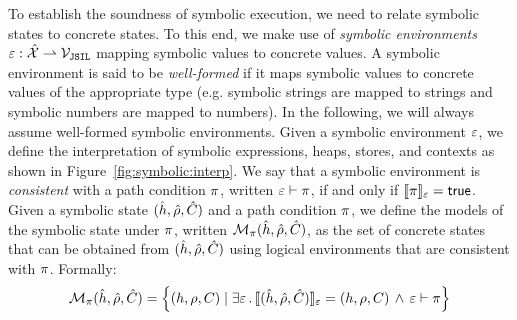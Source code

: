  To establish the soundness of symbolic execution, we need to relate 
symbolic states to concrete states. To this end, we make use of \emph{symbolic environments} 
$\varepsilon : \hat{\mathcal{X}} \rightharpoonup \mathcal{V}_{\mathtt{JSIL}}$ mapping symbolic values to concrete values. 
A symbolic environment is said to be \emph{well-formed} if it maps symbolic 
values to concrete values of the appropriate type (e.g. symbolic strings are mapped to strings 
and symbolic numbers are mapped to numbers). In the following, we will always 
assume well-formed symbolic environments. 
%
Given a symbolic environment $\varepsilon$, we define the interpretation of symbolic 
expressions, heaps, stores, and contexts as shown in Figure~\ref{fig:symbolic:interp}. 
We say that a symbolic environment is \emph{consistent} with a path condition 
$\pi$, written $\varepsilon \vdash \pi$,  if and only if $\llbracket \pi \rrbracket_{\varepsilon} = {\sf true}$. 
Given a symbolic state $(\hat{h}, \hat\rho, \hat{C})$ and a path condition $\pi$, we define 
the models of the symbolic state under $\pi$, written $\mathcal{M}_{\pi}(\hat{h}, \hat\rho, \hat{C})$, 
as the set of concrete states that can be obtained from $(\hat{h}, \hat\rho, \hat{C})$ using 
logical environments that are consistent with $\pi$. Formally:
\begin{equation}
\mathcal{M}_{\pi}(\hat{h}, \hat\rho, \hat{C}) = \left\{ (h, \rho, C) \mid \exists \varepsilon \, . \,  \llbracket (\hat{h}, \hat\rho, \hat{C}) \rrbracket_{\varepsilon} = (h, \rho, C) \, \wedge \,  \varepsilon \vdash \pi  \right\} 
\end{equation}

